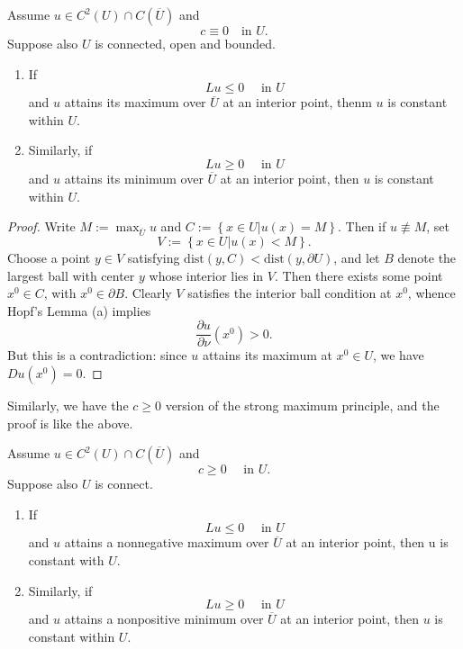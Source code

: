 \begin{theorem}
  Assume $u\in C^2\left( U \right) \cap C\left( \overline{U} \right) $ and 
   \[
  c\equiv 0 \quad \text {in }U.
  \] 
  Suppose also $U$ is connected, open and bounded.
  \begin{enumerate}
    \item If 
      \[
      Lu\le 0 \quad \text{ in }U
      \] 
      and $u$ attains its maximum over $\overline{U}$ at an interior point, thenm $u$ is constant within $U$.
    \item Similarly, if 
      \[
      Lu\ge 0\quad \text{ in }U
      \] 
      and $u$ attains its minimum over $\overline{U}$ at an interior point, then $u$ is constant within $U$.
  \end{enumerate}
\end{theorem}
\begin{proof}
  Write $M:=\max_{\overline{U}}u$ and $C:=\left\{ x\in U\lvert u(x)=M \right\} $. Then if $u\not\equiv M$, set 
  \[
    V:=\left\{ x\in U\lvert u(x)<M \right\} .
  \] 
  Choose a point $y\in V$ satisfying $\text{dist}\left( y,C \right) <\text{dist}\left( y,\partial U \right) $, and let $B$ denote the largest ball with center $y$ whose interior lies in $V$. Then there exists some point $x^{0}\in C$, with $x^{0}\in \partial B$. Clearly $V$ satisfies the interior ball condition at $x^{0}$, whence Hopf's Lemma (a) implies 
  \[
    \frac{\partial u}{\partial \nu} \left( x^{0} \right) >0. 
  \] 
  But this is a contradiction: since $u$ attains its maximum at $x^{0}\in U$, we have $Du(x^{0})=0$.
\end{proof}
Similarly, we have the $c\ge 0$ version of the strong maximum principle, and the proof is like the above.
\begin{theorem}
  Assume $u\in C^{2}\left( U \right) \cap C\left( \overline{U} \right) $ and 
  \[
  c\ge 0 \quad \text{ in } U.
  \] 
  Suppose also $U$ is connect.
  \begin{enumerate}
    \item If 
       \[
      Lu\le 0 \quad \text{ in }U
      \] 
      and $u$ attains a nonnegative maximum over $\overline{U}$ at an interior point, then u is constant with $U$.
    \item Similarly, if 
       \[
      Lu\ge 0\quad \text{ in }U
      \] 
      and $u$ attains a nonpositive minimum over $\overline{U}$ at an interior point, then $u$ is constant within $U$.
  \end{enumerate}
\end{theorem}

